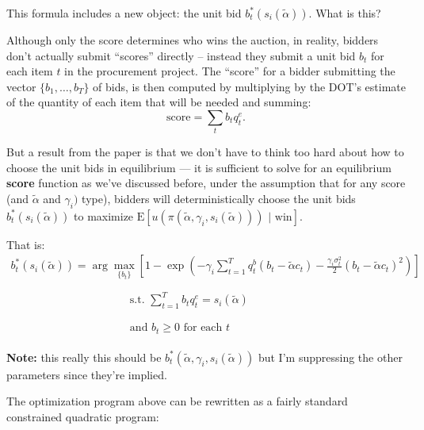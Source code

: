 \documentclass[
]{article}
\begin{document}
This formula includes a new object: the unit bid
\(b_{t}^{*}(s_{i}(\tilde{\alpha}))\). What is this?

Although only the score determines who wins the auction, in reality,
bidders don't actually submit ``scores'' directly -- instead they submit
a unit bid \(b_t\) for each item \(t\) in the procurement project. The
``score'' for a bidder submitting the vector \(\{b_1,\ldots, b_T\}\) of
bids, is then computed by multiplying by the DOT's estimate of the
quantity of each item that will be needed and summing: \[
\text{score} = \sum\limits_t b_t q_t^e.
\]

But a result from the paper is that we don't have to think too hard
about how to choose the unit bids in equilibrium --- it is sufficient to
solve for an equilibrium \textbf{score} function as we've discussed
before, under the assumption that for any score (and \(\tilde{\alpha}\)
and \({\gamma_i})\) type), bidders will deterministically choose the
unit bids \(b_{t}^{*}(s_{i}(\tilde{\alpha}))\) to maximize
\(\text{E}[u(\pi(\tilde{\alpha}, {\gamma_i}, s_{i}(\tilde{\alpha}))) \text{ | win}]\).

That is: \[
\begin{array}{l}
b_{t}^{*}(s_{i}(\tilde{\alpha})) = \arg\max\limits _{\{ b_t \}} \left[1-\exp \left(-{\gamma_i} \sum_{t=1}^{T} q_{t}^{b}\left(b_{t}-\tilde{\alpha} c_{t}\right)-\frac{{\gamma_i} \sigma_{t}^{2}}{2}\left(b_{t}-\tilde{\alpha} c_{t}\right)^{2}\right)\right] \\ \\ \qquad \qquad \qquad \qquad \qquad \begin{aligned} \text { s.t. } \sum_{t=1}^{T} b_{t} q_{t}^{e}= s_{i}(\tilde{\alpha}) \end{aligned}
\\ \\ \qquad \qquad \qquad \qquad \qquad \begin{aligned} \text { and   }  b_{t} \geq 0 \text{ for each } t\end{aligned}
\end{array}
\]

\textbf{Note:} this really this should be
\(b_{t}^{*}(\tilde{\alpha},{\gamma_i}, s_{i}(\tilde{\alpha}) )\) but I'm
suppressing the other parameters since they're implied.

The optimization program above can be rewritten as a fairly standard
constrained quadratic program:
\end{document}
